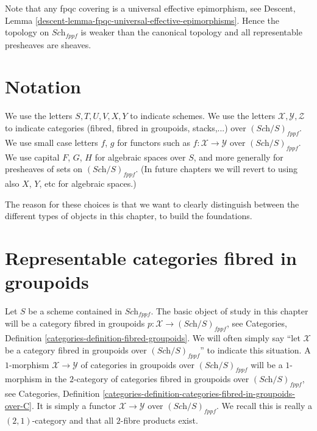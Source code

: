 \medskip\noindent
Note that any fpqc covering is a universal effective
epimorphism, see
Descent, Lemma \ref{descent-lemma-fpqc-universal-effective-epimorphisms}.
Hence the topology on $\textit{Sch}_{fppf}$
is weaker than the canonical topology and all representable presheaves
are sheaves.








\section{Notation}
\label{section-notation}

\noindent
We use the letters $S, T, U, V, X, Y$ to indicate schemes.
We use the letters $\mathcal{X}, \mathcal{Y}, \mathcal{Z}$ to indicate
categories (fibred, fibred in groupoids, stacks,...)
over $(\textit{Sch}/S)_{fppf}$. We use small case letters
$f$, $g$ for functors such as $f : \mathcal{X} \to \mathcal{Y}$
over $(\textit{Sch}/S)_{fppf}$.
We use capital $F$, $G$, $H$ for algebraic spaces over $S$, and more
generally for presheaves of sets on $(\textit{Sch}/S)_{fppf}$.
(In future chapters we will revert to using also $X$, $Y$, etc
for algebraic spaces.)

\medskip\noindent
The reason for these choices is that we want to clearly distinguish between
the different types of objects in this chapter, to build the foundations.









\section{Representable categories fibred in groupoids}
\label{section-representable}

\noindent
Let $S$ be a scheme contained in $\textit{Sch}_{fppf}$.
The basic object of study in this chapter will be a
category fibred in groupoids
$p : \mathcal{X} \to (\textit{Sch}/S)_{fppf}$, see
Categories, Definition \ref{categories-definition-fibred-groupoids}.
We will often simply say ``let $\mathcal{X}$ be a category fibred
in groupoids over $(\textit{Sch}/S)_{fppf}$'' to indicate
this situation. A $1$-morphism $\mathcal{X} \to \mathcal{Y}$ of categories
in groupoids over $(\textit{Sch}/S)_{fppf}$ will be a $1$-morphism
in the $2$-category of categories fibred in groupoids over
$(\textit{Sch}/S)_{fppf}$, see
Categories,
Definition \ref{categories-definition-categories-fibred-in-groupoids-over-C}.
It is simply a functor $\mathcal{X} \to \mathcal{Y}$ over
$(\textit{Sch}/S)_{fppf}$.
We recall this is really a $(2, 1)$-category and that all $2$-fibre products
exist.

